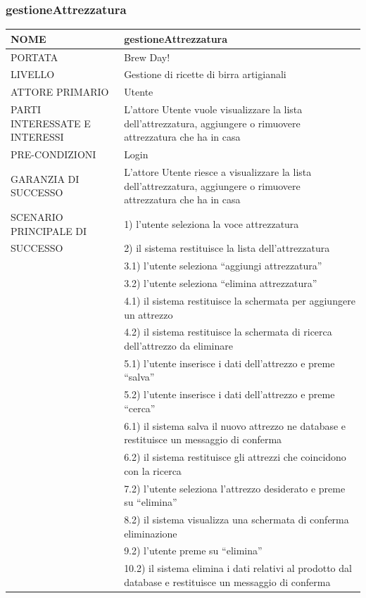 \documentclass[a4paper, titlepage]{article}
\begin{document}
\subsubsection{gestioneAttrezzatura}
\begin{longtable}{p{6cm}p{7cm}}\toprule
    NOME & gestioneAttrezzatura\\\midrule
    PORTATA & Brew Day!\\\midrule
    LIVELLO & Gestione di ricette di birra artigianali\\\midrule
    ATTORE PRIMARIO & Utente\\\midrule
    PARTI INTERESSATE E INTERESSI &
    L’attore Utente vuole visualizzare la lista dell’attrezzatura, aggiungere o rimuovere attrezzatura che ha in casa \\\midrule
    PRE-CONDIZIONI & Login\\\midrule
    GARANZIA DI SUCCESSO & L’attore Utente riesce a visualizzare la lista dell’attrezzatura, aggiungere o rimuovere
    attrezzatura che ha in casa\\\midrule
    SCENARIO PRINCIPALE DI
    & 1) l’utente seleziona la voce attrezzatura\\
    SUCCESSO & 2) il sistema restituisce la lista dell’attrezzatura\\
    & 3.1) l’utente seleziona “aggiungi attrezzatura”\\
    & 3.2) l’utente seleziona “elimina attrezzatura”\\
    & 4.1) il sistema restituisce la schermata per aggiungere un attrezzo\\
    & 4.2) il sistema restituisce la schermata di ricerca dell’attrezzo da eliminare\\
    & 5.1) l’utente inserisce i dati dell’attrezzo e preme “salva”\\
    & 5.2) l’utente inserisce i dati dell’attrezzo e preme “cerca”\\
    & 6.1) il sistema salva il nuovo attrezzo ne database e restituisce un messaggio di conferma\\
    & 6.2) il sistema restituisce gli attrezzi che coincidono con la ricerca\\
    & 7.2) l’utente seleziona l’attrezzo desiderato e preme su “elimina”\\
    & 8.2) il sistema visualizza una schermata di conferma eliminazione\\
    & 9.2) l’utente preme su “elimina”\\
    & 10.2) il sistema elimina i dati relativi al prodotto dal database e restituisce un messaggio di conferma\\\midrule

\end{longtable}
\end{document}
